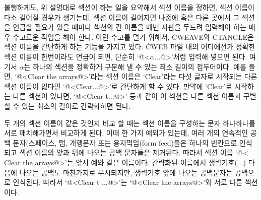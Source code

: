 불행하게도, 위 설명대로 섹션이 하는 일을 요약해서 섹션 이름을 정하면, 섹션 이름이 다소 길어질
경우가 생기는데, 섹션 이름이 길어지면 나중에 혹은 다른 곳에서 그 섹션을 언급할 필요가 있을
때마다 섹션의 긴 이름을 매번 자판을 두드려 입력해야 하는 매우 수고로운 작업을 해야 한다.
이런 수고를 덜기 위해서, \.{CWEAVE}와 \.{CTANGLE}은 섹션 이름을 간단하게 하는 기능을
가지고 있다. \.{CWEB} 파일 내의 어디에선가 정확한 섹션 이름이 한번이라도 언급이 되면, 단순히
`\.{@<$\alpha$...@>}'처럼 입력해 넣으면 된다. 여기서 $\alpha$는 하나의 섹션을 정확하게
구분해 낼 수 있는 최소 길이의 접두어이다. 예를 들면, `\.{@<Clear the arrays@>}'라는 섹션
이름은 `Clear'라는 다섯 글자로 시작되는 다른 섹션 이름이 없다면 `\.{@<Clear...@>}'로
간단하게 할 수 있다. 만약에 `Clear'로 시작하는 다른 섹션이 있다면, `\.{@<Clear t...@>}'
등과 같이 이 섹션을 다른 섹션 이름과 구별할 수 있는 최소의 길이로 간략화하면 된다.

두 개의 섹션 이름이 같은 것인지 비교 할 때는 섹션 이름을 구성하는 문자 하나하나를 서로
매치해가면서 비교하게 된다. 이때 한 가지 예외가 있는데, 여러 개의 연속적인 공백 문자(스페이스,
탭, 개행문자 또는 용지먹임(form feed)들은 하나의 빈칸으로 인식되고 섹션 이름의 앞과 뒤에
나오는 공백 문자들은 제거된다. 따라서 섹션 이름 `\.{@< Clear the arrays@>}'는 앞서 예와
같은 이름이다. 간략화된 이름에서 생략기호($\ldots$) 다음에 나오는 공백도 마찬가지로
무시되지만, 생략기호 앞에 나오는 공백문자는 공백으로 인식된다. 따라서
`\.{@<Clear t ...@>}'는 `\.{@<Clear the arrays@>}'와 서로 다른 섹션이다.

